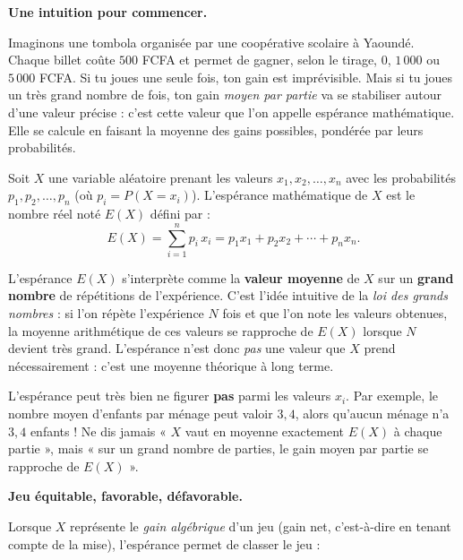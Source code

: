 \documentclass[11pt]{article}
\newcommand{\cle}[1]{{\popxbold\color{popdark}#1}}
\newcounter{popsec}
\newcounter{popsub}
\newcommand{\courssub}[1]{%
  \stepcounter{popsub}%
  \par\vspace{9pt}\noindent{\popxbold\fontsize{11.5}{13}\selectfont\color{popink}{\color{poporange}\thepopsec.\thepopsub}\hspace{6pt}#1}\par\nopagebreak\vspace{4pt}
}
\begin{document}
\courssub{Espérance mathématique}

\textbf{Une intuition pour commencer.}\par
Imaginons une tombola organisée par une coopérative scolaire à Yaoundé. Chaque billet coûte $500$ FCFA et permet de gagner, selon le tirage, $0$, $1\,000$ ou $5\,000$ FCFA. Si tu joues une seule fois, ton gain est imprévisible. Mais si tu joues un très grand nombre de fois, ton gain \emph{moyen par partie} va se stabiliser autour d'une valeur précise : c'est cette valeur que l'on appelle \cle{espérance mathématique}. Elle se calcule en faisant la moyenne des gains possibles, pondérée par leurs probabilités.

\begin{definition}
Soit $X$ une variable aléatoire prenant les valeurs $x_1, x_2, \dots, x_n$ avec les probabilités $p_1, p_2, \dots, p_n$ (où $p_i = P(X = x_i)$). L'\cle{espérance mathématique} de $X$ est le nombre réel noté $E(X)$ défini par :
\[ E(X) = \sum_{i=1}^{n} p_i\, x_i = p_1 x_1 + p_2 x_2 + \cdots + p_n x_n. \]
\end{definition}

\begin{aretenir}
L'espérance $E(X)$ s'interprète comme la \textbf{valeur moyenne} de $X$ sur un \textbf{grand nombre} de répétitions de l'expérience. C'est l'idée intuitive de la \emph{loi des grands nombres} : si l'on répète l'expérience $N$ fois et que l'on note les valeurs obtenues, la moyenne arithmétique de ces valeurs se rapproche de $E(X)$ lorsque $N$ devient très grand. L'espérance n'est donc \emph{pas} une valeur que $X$ prend nécessairement : c'est une moyenne théorique à long terme.
\end{aretenir}

\begin{attention}
L'espérance peut très bien ne figurer \textbf{pas} parmi les valeurs $x_i$. Par exemple, le nombre moyen d'enfants par ménage peut valoir $3,4$, alors qu'aucun ménage n'a $3,4$ enfants ! Ne dis jamais « $X$ vaut en moyenne exactement $E(X)$ à chaque partie », mais « sur un grand nombre de parties, le gain moyen par partie se rapproche de $E(X)$ ».
\end{attention}

\textbf{Jeu équitable, favorable, défavorable.}\par
Lorsque $X$ représente le \emph{gain algébrique} d'un jeu (gain net, c'est-à-dire en tenant compte de la mise), l'espérance permet de classer le jeu :
\end{document}
